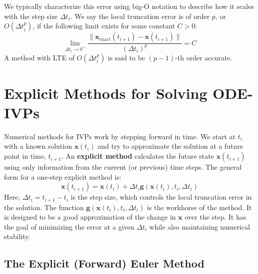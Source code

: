 We typically characterize this error using big-O notation to describe how it scales with the step size $\Delta t_i$. We say the local truncation error is of order $p$, or $O(\Delta t_i^p)$, if the following limit exists for some constant $C > 0$:
\begin{equation}
\lim_{\Delta t_i \to 0^+} \frac{\| \mathbf{x}_{\text{exact}}(t_{i+1}) - \mathbf{x}(t_{i+1}) \|}{(\Delta t_i)^p} = C
\end{equation}
A method with LTE of $O(\Delta t_i^p)$ is said to be $(p-1)$-th order accurate.

\section{Explicit Methods for Solving ODE-IVPs}
Numerical methods for IVPs work by stepping forward in time. We start at $t_i$ with a known solution $\mathbf{x}(t_i)$ and try to approximate the solution at a future point in time, $t_{i+1}$. An \textbf{explicit method} calculates the future state $\mathbf{x}(t_{i+1})$ using only information from the current (or previous) time steps. The general form for a one-step explicit method is:
\begin{equation}
    \mathbf{x}(t_{i+1}) = \mathbf{x}(t_i) + \Delta t_i \mathbf{g}(\mathbf{x}(t_i), t_i, \Delta t_i)
\end{equation}
Here, $\Delta t_i = t_{i+1} - t_i$ is the step size, which controls the local truncation error in the solution. The function $\mathbf{g}(\mathbf{x}(t_i), t_i, \Delta t_i)$ is the workhorse of the method. It is designed to be a good approximation of the change in $\mathbf{x}$ over the step. It has the goal of minimizing the error at a given $\Delta t_i$ while also maintaining numerical stability.

\subsection{The Explicit (Forward) Euler Method}

